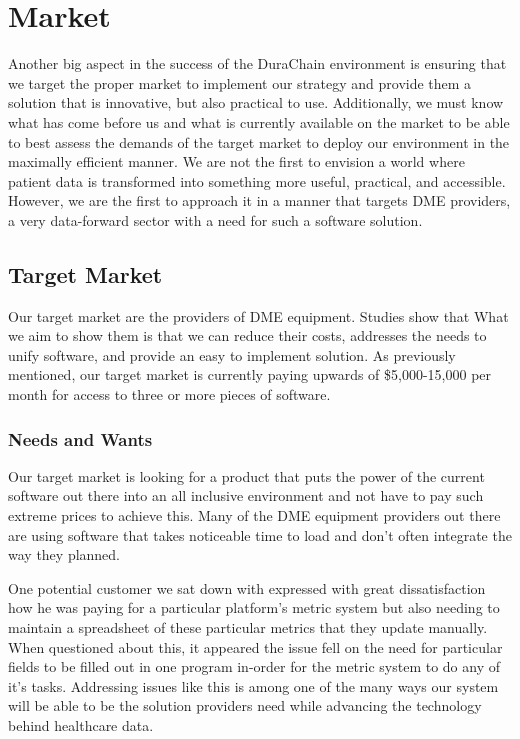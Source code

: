 \documentclass[preprint,pre,floats,aps,amsmath,amssymb]{revtex4-1}
\begin{document}
\section{Market}
Another big aspect in the success of the DuraChain environment is ensuring that we target the proper market to implement our strategy and provide them a solution that is innovative, but also practical to use. Additionally, we must know what has come before us and what is currently available on the market to be able to best assess the demands of the target market to deploy our environment in the maximally efficient manner. We are not the first to envision a world where patient data is transformed into something more useful, practical, and accessible. However, we are the first to approach it in a manner that targets DME providers, a very data-forward sector with a need for such a software solution.

\subsection{Target Market}
Our target market are the providers of DME equipment. Studies show that What we aim to show them is that we can reduce their costs, addresses the needs to unify software, and provide an easy to implement solution. As previously mentioned, our target market is currently paying upwards of \$5,000-15,000 per month for access to three or more pieces of software.

  \subsubsection{Needs and Wants}
  Our target market is looking for a product that puts the power of the current software out there into an all inclusive environment and not have to pay such extreme prices to achieve this. Many of the DME equipment providers out there are using software that takes noticeable time to load and don’t often integrate the way they planned.

  One potential customer we sat down with expressed with great dissatisfaction how he was paying for a particular platform’s metric system but also needing to maintain a spreadsheet of these particular metrics that they update manually. When questioned about this, it appeared the issue fell on the need for particular fields to be filled out in one program in-order for the metric system to do any of it’s tasks. Addressing issues like this is among one of the many ways our system will be able to be the solution providers need while advancing the technology behind healthcare data.
\end{document}

